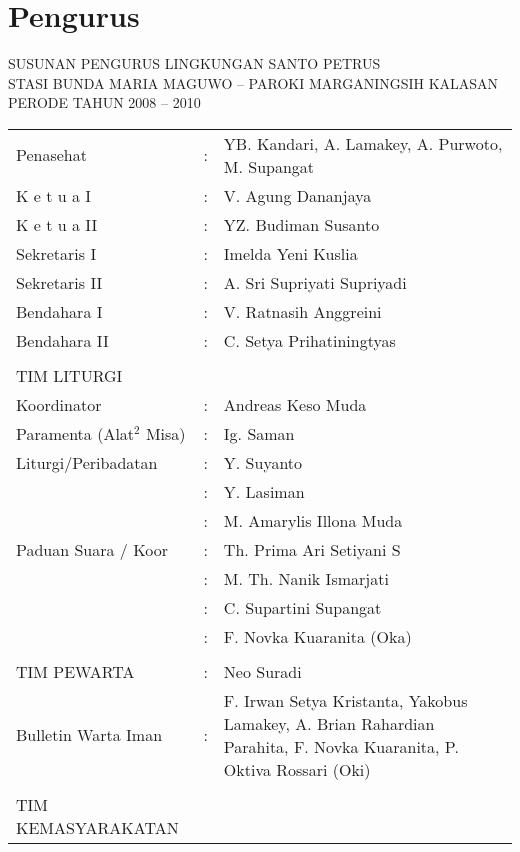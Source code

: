 \section{Pengurus}
\begin{center}
SUSUNAN PENGURUS LINGKUNGAN SANTO PETRUS\\
STASI BUNDA MARIA MAGUWO -- PAROKI MARGANINGSIH KALASAN\\
PERODE TAHUN 2008 -- 2010
\end{center}

\begin{longtable}{p{5cm}cp{5cm}}
Penasehat&:&  YB. Kandari, A. Lamakey, A. Purwoto, M. Supangat \\
K e t u a I&:&  V. Agung Dananjaya\\ 
K e t u a II&:&  YZ. Budiman Susanto\\
Sekretaris I&:&  Imelda Yeni Kuslia\\
Sekretaris II&:&  A. Sri Supriyati Supriyadi\\
Bendahara I&:&  V. Ratnasih Anggreini\\ 
Bendahara II&:&  C. Setya Prihatiningtyas \\  
\\
TIM LITURGI\\
\hspace{0.75cm}Koordinator&:&  Andreas Keso Muda\\
\hspace{0.75cm}Paramenta (Alat$^2$ Misa)&:&  Ig. Saman\\
\hspace{0.75cm}Liturgi/Peribadatan&:&  Y. Suyanto\\
&:&  Y. Lasiman\\
&:&  M. Amarylis Illona Muda\\
\hspace{0.75cm}Paduan Suara / Koor&:&  Th. Prima Ari Setiyani S\\  
&:&  M. Th. Nanik Ismarjati\\
&:&  C. Supartini Supangat\\
&:&  F. Novka Kuaranita (Oka)\\
\\
TIM PEWARTA&:&  Neo Suradi\\
\hspace{0.75cm}Bulletin Warta Iman&:&  F. Irwan Setya Kristanta, Yakobus Lamakey,
  A. Brian Rahardian Parahita, F. Novka Kuaranita,
  P. Oktiva Rossari (Oki)\\
\\
TIM KEMASYARAKATAN \\

\end{longtable}
